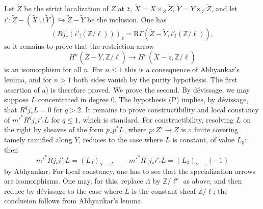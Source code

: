 \documentclass[11pt]{article}
\begin{document}
Let $\widetilde Z$ be the strict localization of $Z$ at $\bar z$, $\widetilde X=X\times_Z\widetilde Z$, $\widetilde Y=Y\times_Z\widetilde Z$, and let $i':\widetilde Z-(\widetilde X\cup\widetilde Y)\hookrightarrow \widetilde Z-\widetilde Y$ be the inclusion. One has
\[
(Rj_*(i'_!(\mathbb Z/\ell)))_{\bar z}
=\mathrm R\Gamma(\widetilde Z-\widetilde Y,i'_!(\mathbb Z/\ell)),
\]
so it remains to prove that the restriction arrow
\[
H^n(\widetilde Z-\widetilde Y,\mathbb Z/\ell)
\longrightarrow
H^n(\widetilde X-z,\mathbb Z/\ell)
\]
is an isomorphism for all $n$. For $n\le1$ this is a consequence of Abhyankar's lemma, and for $n>1$ both sides vanish by the purity hypothesis. The first assertion of a) is therefore proved. We prove the second. By dévissage, we may suppose $L$ concentrated in degree $0$. The hypothesis (P) implies, by dévissage, that $R^qj_*L=0$ for $q>2$. It remains to prove constructibility and local constancy of $m'^*R^qj_*i'_!L$ for $q\le1$, which is standard. For constructibility, resolving $L$ on the right by sheaves of the form $p_*p^*L$, where $p:Z'\to Z$ is a finite covering tamely ramified along $Y$, reduces to the case where $L$ is constant, of value $L_0$: then
\[
m'^*Rj_*i'_!L=(L_0)_{Y-z},
\qquad
m'^*R^1j_*i'_!L=(L_0)_{Y-z}(-1)
\]
by Abhyankar. For local constancy, one has to see that the specialization arrows are isomorphisms. One may, for this, replace $\Lambda$ by $\mathbb Z/\ell^\nu$ as above, and then reduce by dévissage to the case where $L$ is the constant sheaf $\mathbb Z/\ell$; the conclusion follows from Abhyankar's lemma.
\end{document}
